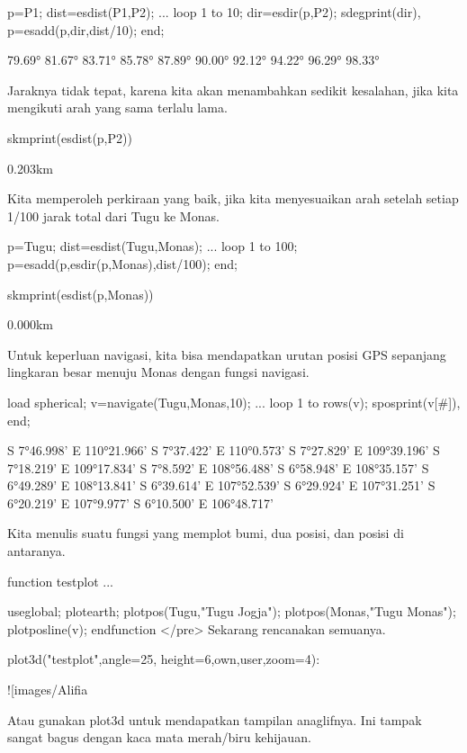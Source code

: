 \documentclass{article}
\begin{document}
\>p=P1;  dist=esdist(P1,P2); ...  
\>     loop 1 to 10; dir=esdir(p,P2); sdegprint(dir), p=esadd(p,dir,dist/10); end;


         79.69°
         81.67°
         83.71°
         85.78°
         87.89°
         90.00°
         92.12°
         94.22°
         96.29°
         98.33°

Jaraknya tidak tepat, karena kita akan menambahkan sedikit kesalahan,
jika kita mengikuti arah yang sama terlalu lama.


\>skmprint(esdist(p,P2))


         0.203km

Kita memperoleh perkiraan yang baik, jika kita menyesuaikan arah
setelah setiap 1/100 jarak total dari Tugu ke Monas.


\>p=Tugu; dist=esdist(Tugu,Monas); ...  
\>     loop 1 to 100; p=esadd(p,esdir(p,Monas),dist/100); end;

\>skmprint(esdist(p,Monas))


         0.000km

Untuk keperluan navigasi, kita bisa mendapatkan urutan posisi GPS
sepanjang lingkaran besar menuju Monas dengan fungsi navigasi.


\>load spherical; v=navigate(Tugu,Monas,10); ...  
\>     loop 1 to rows(v); sposprint(v[#]), end;


    S 7°46.998' E 110°21.966'
    S 7°37.422' E 110°0.573'
    S 7°27.829' E 109°39.196'
    S 7°18.219' E 109°17.834'
    S 7°8.592' E 108°56.488'
    S 6°58.948' E 108°35.157'
    S 6°49.289' E 108°13.841'
    S 6°39.614' E 107°52.539'
    S 6°29.924' E 107°31.251'
    S 6°20.219' E 107°9.977'
    S 6°10.500' E 106°48.717'

Kita menulis suatu fungsi yang memplot bumi, dua posisi, dan posisi di
antaranya.


\>function testplot ...


    useglobal;
    plotearth;
    plotpos(Tugu,"Tugu Jogja"); plotpos(Monas,"Tugu Monas");
    plotposline(v);
    endfunction
</pre>
Sekarang rencanakan semuanya.


\>plot3d("testplot",angle=25, height=6,\>own,\>user,zoom=4):


![images/Alifia%

Atau gunakan plot3d untuk mendapatkan tampilan anaglifnya. Ini tampak
sangat bagus dengan kaca mata merah/biru kehijauan.
\end{document}
